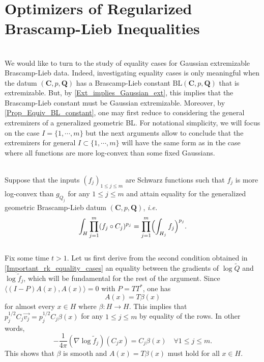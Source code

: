 \documentclass[11pt,a4paper,reqno]{amsart}
\numberwithin{equation}{section}
\theoremstyle{definition}
\renewcommand{\tilde}{\widetilde}
\newcommand{\<}{\ensuremath \leq}
\renewcommand{\>}{\ensuremath \geq}
\renewcommand{\tilde}{\widetilde}
\begin{document}
\hfill \\



\bigskip




\section{Optimizers of Regularized Brascamp-Lieb Inequalities}

\hfill \\

We would like to turn to the study of equality cases for Gaussian extremizable Brascamp-Lieb data. Indeed, investigating equality cases is only meaningful when the datum $(\textbf{C},p,\textbf{Q})$ has a Brascamp-Lieb constant $\mathrm{BL}(\textbf{C},p,\textbf{Q})$ that is extremizable. But, by \cref{Ext_implies_Gaussian_ext}, this implies that the Brascamp-Lieb constant must be Gaussian extremizable. Moreover, by \cref{Prop_Equiv_BL_constant}, one may first reduce to considering the general extremizers of a generalized geometric BL. 
For notational simplicity, we will focus on the case $I=\{1,\cdots,m\}$ but the next arguments allow to conclude that the extremizers for general $I \subset \{1,\cdots,m\}$ will have the same form as in the case where all functions are more log-convex than some fixed Gaussians.

\hfill \\

Suppose that the inputs $(f_j)_{1 \leq j \leq m}$ are Schwarz functions such that $f_j$ is more log-convex than $g_{Q_j}$ for any $1 \leq j \leq m$ and attain equality for the generalized geometric Brascamp-Lieb datum $(\textbf{C},p,\textbf{Q})$, \textit{i.e.} $$\int_H \prod_{j=1}^m (f_j \circ C_j)^{p_j} =\prod_{j=1}^m \Bigl (\int_{H_j}f_j\Bigl)^{p_j}.$$ 
\hfill \\
Fix some time $t>1.$ Let us first derive from the second condition obtained in \cref{Important_rk_equality_cases} an equality between the gradients of $\log \tilde Q$ and $\log \tilde f_j$, which will be fundamental for the rest of the argument. 
Since $\langle (I-P)A(x),A(x)\rangle=0$ with $P=TT^*$, one has $$A(x)=T\beta(x)$$ for almost every $x \in  H$ where $\beta: H \rightarrow H.$ This implies that $p_j^{1/2}C_j \overrightarrow{v_j}=p_j^{1/2}C_j\beta(x)$ for any $1 \leq j \leq m$ by equality of the rows. In other words, $$-\frac{1}{4\pi}(\nabla \log \tilde f_j)(C_jx)=C_j\beta(x) \quad \forall 1 \leq j \leq m.$$ This shows that $\beta$ is smooth and $A(x)=T\beta(x)$ must hold for all $x \in H.$ 
\end{document}
